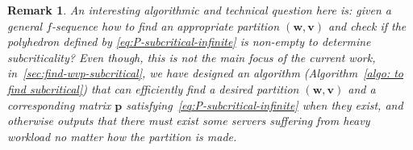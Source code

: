 \documentclass[11pt, reqno]{article}
\newtheorem{remark}[theorem]{Remark}
\numberwithin{equation}{section}
\numberwithin{theorem}{section}
\begin{document}
\begin{remark}\normalfont
An interesting algorithmic and technical question here is: \emph{given a general $f$-sequence how to find an appropriate partition $(\mathbf{w},\mathbf{v})$ and check if the polyhedron defined by \eqref{eq:P-subcritical-infinite} is non-empty to determine subcriticality?}
Even though, this is not the main focus of the current work, in~\ref{sec:find-wvp-subcritical}, we 
have designed an algorithm (Algorithm~\ref{algo: to find subcritical}) that can efficiently find a desired partition $(\mathbf{w},\mathbf{v})$ and a corresponding matrix $\mathbf{p}$ satisfying~\eqref{eq:P-subcritical-infinite} when they exist, and 
otherwise outputs that there must exist some servers suffering from heavy workload no matter how the partition is made.  
\end{remark}


\end{document}

